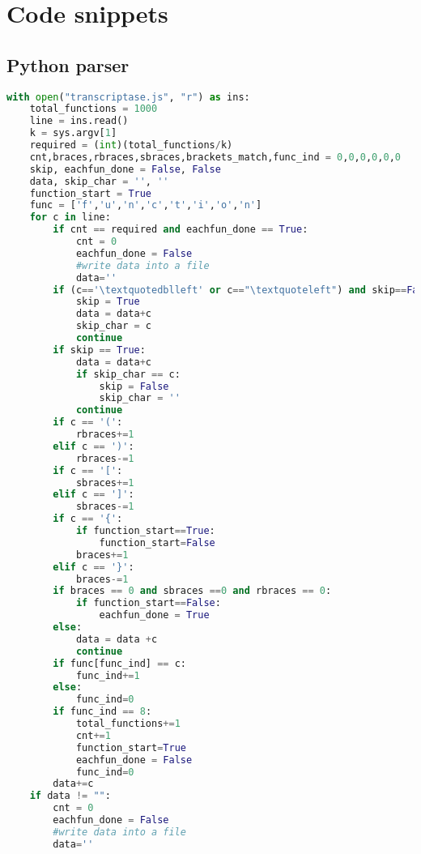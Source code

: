 \chapter{Code snippets\label{app:appa}}

\section{Python parser}
\label{sec:pythonparsersec}

\begin{lstlisting}[language=Python, caption={The parser code detects the valid start and end point of the JavaScript functions and properly splits the Transcriptase code.},label={lst:pythonparser}, mathescape=false]
with open("transcriptase.js", "r") as ins:
    total_functions = 1000 
    line = ins.read()
    k = sys.argv[1]        
    required = (int)(total_functions/k)
    cnt,braces,rbraces,sbraces,brackets_match,func_ind = 0,0,0,0,0,0
    skip, eachfun_done = False, False
    data, skip_char = '', ''
    function_start = True
    func = ['f','u','n','c','t','i','o','n']
    for c in line:
        if cnt == required and eachfun_done == True:
            cnt = 0
            eachfun_done = False
            #write data into a file 
            data=''
        if (c=='\textquotedblleft' or c=="\textquoteleft") and skip==False:
            skip = True
            data = data+c
            skip_char = c
            continue
        if skip == True:
            data = data+c
            if skip_char == c:
                skip = False
                skip_char = ''
            continue
        if c == '(':
            rbraces+=1
        elif c == ')':
            rbraces-=1
        if c == '[':
            sbraces+=1
        elif c == ']':
            sbraces-=1
        if c == '{':
            if function_start==True:
                function_start=False
            braces+=1
        elif c == '}':
            braces-=1
        if braces == 0 and sbraces ==0 and rbraces == 0:
            if function_start==False:
                eachfun_done = True
        else:
            data = data +c
            continue 
        if func[func_ind] == c:
            func_ind+=1
        else:
            func_ind=0
        if func_ind == 8:
            total_functions+=1
            cnt+=1
            function_start=True
            eachfun_done = False
            func_ind=0
        data+=c
    if data != "":
        cnt = 0
        eachfun_done = False
        #write data into a file 
        data=''
\end{lstlisting}
